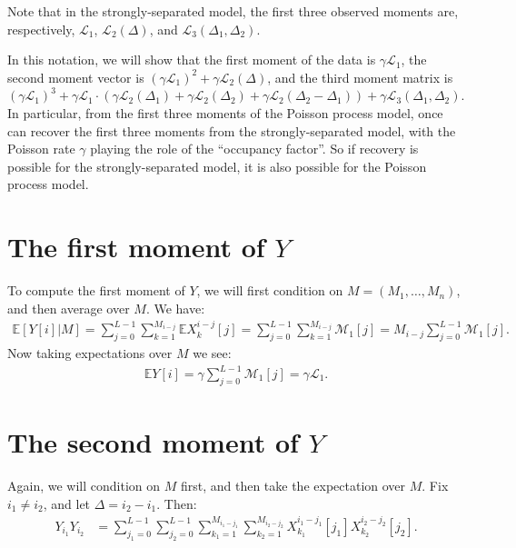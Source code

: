 \documentclass{article}
\theoremstyle{thm}
\theoremstyle{definition}
\newcommand{\E}{\mathbb{E}}
\newcommand{\1}{\mathbf{1}}
\newcommand{\M}{\mathcal{M}}
\renewcommand{\L}{\mathcal{L}}
\begin{document}
Note that in the strongly-separated model, the first three observed moments are, respectively, $\L_1$, $\L_2(\Delta)$, and $\L_3(\Delta_1,\Delta_2)$.

%

In this notation, we will show that the first moment of the data is $\gamma \L_1$, the second moment vector is $(\gamma \L_1)^2 + \gamma \L_2(\Delta)$, and the third moment matrix is $(\gamma \L_1)^3 + \gamma \L_1  \cdot ( \gamma\L_2(\Delta_1) + \gamma\L_2(\Delta_2) + \gamma\L_2(\Delta_2-\Delta_1)) + \gamma \L_3(\Delta_1,\Delta_2) $. In particular, from the first three moments of the Poisson process model, once can recover the first three moments from the strongly-separated model, with the Poisson rate $\gamma$ playing the role of the ``occupancy factor''. So if recovery is possible for the strongly-separated model, it is also possible for the Poisson process model.


%


\section{The first moment of $Y$}

To compute the first moment of $Y$, we will first condition on $M = (M_1,\dots,M_n)$, and then average over $M$. We have:
%
\begin{align}
%
\E[Y[i] | M] = \sum_{j=0}^{L-1} \sum_{k=1}^{M_{i-j}} \E X_k^{i-j}[j]
= \sum_{j=0}^{L-1} \sum_{k=1}^{M_{i-j}} \M_1[j]
= M_{i-j} \sum_{j=0}^{L-1} \M_1[j].
%
\end{align}
%
Now taking expectations over $M$ we see:
%
\begin{align}
%
\E Y[i] = \gamma \sum_{j=0}^{L-1} \M_1[j] = \gamma \L_1.
%
\end{align}


%


\section{The second moment of $Y$}

Again, we will condition on $M$ first, and then take the expectation over $M$. Fix $i_1 \ne i_2$, and let $\Delta = i_2 - i_1$. Then:
%
\begin{align}
%
Y_{i_1} Y_{i_2} 
    &= \sum_{j_1=0}^{L-1} \sum_{j_2=0}^{L-1} 
        \sum_{k_1=1}^{M_{i_1-j_1}}\sum_{k_2=1}^{M_{i_2-j_2}}
            X_{k_1}^{i_1-j_1}[j_1] X_{k_2}^{i_2 - j_2}[j_2].
%
\end{align}
\end{document}
